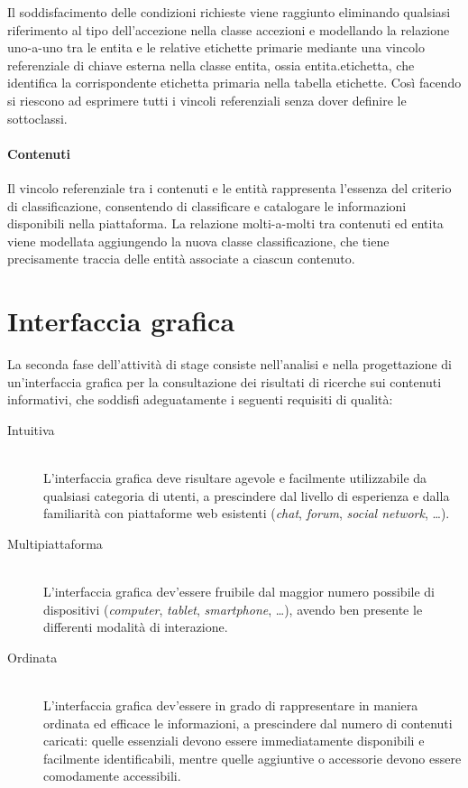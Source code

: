 Il soddisfacimento delle condizioni richieste viene raggiunto eliminando qualsiasi riferimento al tipo dell'accezione nella classe \textsf{accezioni} e modellando la relazione uno-a-uno tra le entita e le relative etichette primarie mediante una vincolo referenziale di chiave esterna nella classe \textsf{entita}, ossia \textsf{entita.etichetta}, che identifica la corrispondente etichetta primaria nella tabella \textsf{etichette}. Così facendo si riescono ad esprimere tutti i vincoli referenziali senza dover definire le sottoclassi.

\paragraph{Contenuti}
Il vincolo referenziale tra i contenuti e le entità rappresenta l'essenza del criterio di classificazione, consentendo di classificare e catalogare le informazioni disponibili nella piattaforma. La relazione molti-a-molti tra \textsf{contenuti} ed \textsf{entita} viene modellata aggiungendo la nuova classe \textsf{classificazione}, che tiene precisamente traccia delle entità associate a ciascun contenuto.

\section{Interfaccia grafica}
\label{sec:tesi:stage:gui}
La seconda fase dell'attività di stage consiste nell'analisi e nella progettazione di un'interfaccia grafica per la consultazione dei risultati di ricerche sui contenuti informativi, che soddisfi adeguatamente i seguenti requisiti di qualità:
\begin{description}
	\item[Intuitiva] \hfill \\
	L'interfaccia grafica deve risultare agevole e facilmente utilizzabile da qualsiasi categoria di utenti, a prescindere dal livello di esperienza e dalla familiarità con piattaforme web esistenti (\textit{chat}, \textit{forum}, \textit{social network}, \ldots).
	\item[Multipiattaforma] \hfill \\
	L'interfaccia grafica dev'essere fruibile dal maggior numero possibile di dispositivi (\textit{computer}, \textit{tablet}, \textit{smartphone}, \ldots), avendo ben presente le differenti modalità di interazione.
	\item[Ordinata] \hfill \\
	L'interfaccia grafica dev'essere in grado di rappresentare in maniera ordinata ed efficace le informazioni, a prescindere dal numero di contenuti caricati: quelle essenziali devono essere immediatamente disponibili e facilmente identificabili, mentre quelle aggiuntive o accessorie devono essere comodamente accessibili.
\end{description}


